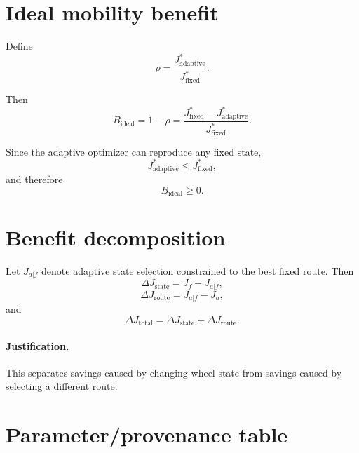 \documentclass[11pt]{article}
\begin{document}
\section{Ideal mobility benefit}

Define
\begin{equation}
\rho
=
\frac{J_{\mathrm{adaptive}}^*}
{J_{\mathrm{fixed}}^*}.
\end{equation}

Then
\begin{equation}
\boxed{
B_{\mathrm{ideal}}
=
1-\rho
=
\frac{
J_{\mathrm{fixed}}^*
-
J_{\mathrm{adaptive}}^*
}{
J_{\mathrm{fixed}}^*
}
}.
\end{equation}

Since the adaptive optimizer can reproduce any fixed state,
\begin{equation}
J_{\mathrm{adaptive}}^*
\le
J_{\mathrm{fixed}}^*,
\end{equation}
and therefore
\begin{equation}
B_{\mathrm{ideal}}\ge0.
\end{equation}

\section{Benefit decomposition}

Let $J_{a|f}$ denote adaptive state selection constrained to the best fixed route. Then
\begin{equation}
\Delta J_{\mathrm{state}}
=
J_f-J_{a|f},
\end{equation}
\begin{equation}
\Delta J_{\mathrm{route}}
=
J_{a|f}-J_a,
\end{equation}
and
\begin{equation}
\Delta J_{\mathrm{total}}
=
\Delta J_{\mathrm{state}}
+
\Delta J_{\mathrm{route}}.
\end{equation}

\paragraph{Justification.}
This separates savings caused by changing wheel state from savings caused by selecting a different route.

\section{Parameter/provenance table}
\end{document}

